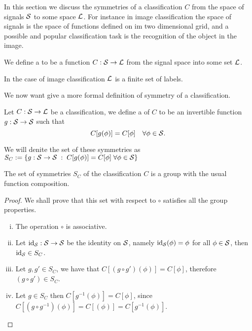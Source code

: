 \documentclass[../3.tex]{subfiles}
\begin{document}
   In this section we discuss the symmetries of a classification $C$ from the space of signals $\mathcal{S}$ to some space $\mathcal{L}$.
   For instance in image classification the space of signals is the space of functions defined on im two dimensional grid,
   and a possible and popular classification task is the recognition of the object in the image.
 

    \begin{defn}
        We define a  to be a function $C : \mathcal{S} \to \mathcal{L}$ from the signal space into some set $\mathcal{L}$.
    \end{defn}

    In the case of image classification $\mathcal{L}$ is a finite set of labels.

    We now want give a more formal definition of symmetry of a classification.

    \begin{defn}
        Let $C : \mathcal{S} \to \mathcal{L}$ be a classification, we define a  of $C$ to be an invertible function
        $g : \mathcal{S} \to \mathcal{S}$ such that 
        \[ C[g(\phi)] = C[\phi] \quad \forall \phi \in \mathcal{S}. \]
    \end{defn}

    We will denite the set of these symmetries as $S_C := \{ g : \mathcal{S} \to \mathcal{S} \; : \; C[g(\phi)] = C[\phi] \;  \forall \phi \in \mathcal{S}\}$

    \begin{prop}
        The set of symmetries $S_C$ of the classification $C$ is a group with the usual function composition.
    \end{prop} 
    \begin{proof}
        We shall prove that this set with respect to $\circ$ satisfies all the group properties.
        \begin{enumerate}[(i)]
            \item The operation $\circ$ is associative.
            \item Let $\text{id}_{\mathcal{S}} : \mathcal{S} \to \mathcal{S}$ be the identity on $\mathcal{S}$, namely $\text{id}_{\mathcal{S}}(\phi) = \phi$ for all $\phi \in \mathcal{S}$,
                then $\text{id}_{\mathcal{S}} \in S_C$.
            \item Let $g,g' \in S_C$, we have that $C[(g\circ g')(\phi)] = C[\phi]$, therefore $(g \circ g') \in S_C$.
            \item Let $g \in S_C$ then $C[g^{-1}(\phi)] = C[\phi]$, since $C[(g \circ g^{-1})(\phi)] = C[(\phi)] = C[g^{-1}(\phi)]$. \qedhere
        \end{enumerate}
    \end{proof}
\end{document}
